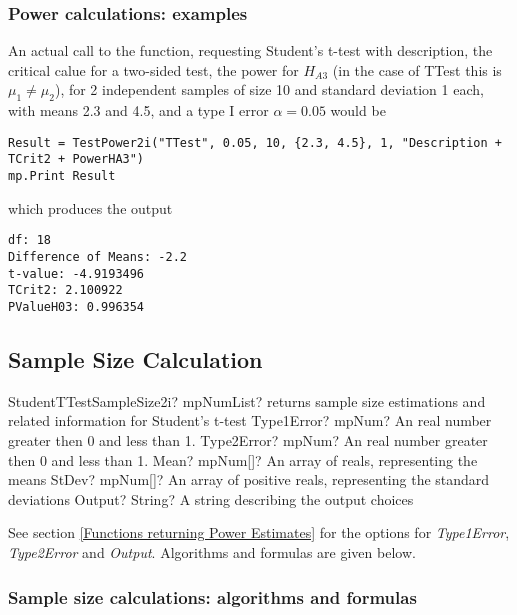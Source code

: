 \subsubsection{Power calculations: examples}
An actual call to the function, requesting Student's t-test with description, the critical calue for a two-sided test, the power for $H_{A3}$ (in the case of \textsf{TTest} this is $\mu_1 \neq \mu_2$), for 2 independent samples of size 10 and standard deviation 1 each, with means 2.3 and 4.5, and a type I error $\alpha=0.05$ would be

\begin{lstlisting}
Result = TestPower2i("TTest", 0.05, 10, {2.3, 4.5}, 1, "Description + TCrit2 + PowerHA3")
mp.Print Result
\end{lstlisting}
which produces the output

\begin{verbatim}
df: 18
Difference of Means: -2.2
t-value: -4.9193496
TCrit2: 2.100922
PValueH03: 0.996354
\end{verbatim}





\newpage
\subsection{Sample Size Calculation}


\begin{mpFunctionsExtract}
	\mpFunctionFiveNotImplemented
	{StudentTTestSampleSize2i? mpNumList? returns sample size estimations and related information for Student's t-test}
	{Type1Error? mpNum? An real number greater then 0 and less than 1.}
	{Type2Error? mpNum? An real number greater then 0 and less than 1.}
	{Mean? mpNum[]? An array of reals, representing the means}
	{StDev? mpNum[]? An array of positive reals, representing the standard deviations}
	{Output? String? A string describing the output choices}
\end{mpFunctionsExtract}

\vspace{0.3cm}
See section \ref{Functions returning Power Estimates} for the options for {\itshape\sffamily Type1Error},  {\itshape\sffamily Type2Error} and {\itshape\sffamily Output}. Algorithms and formulas are given below.



\subsubsection{Sample size calculations: algorithms and formulas}

